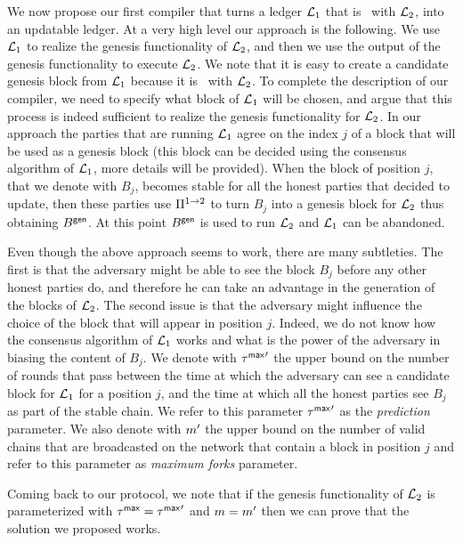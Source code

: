 We now propose our first compiler that turns a ledger $\mathcal{L}_1$ that is \gencompatible\ with $\mathcal{L}_2$,
into an updatable ledger.
At a very high level our approach is the following. We use $\mathcal{L}_1$ to realize the genesis functionality 
of $\mathcal{L}_2$, and then we use the output of the genesis functionality to execute $\mathcal{L}_2$.
We note that it is easy to create a candidate genesis block from $\mathcal{L}_1$ because it is \gencompatible\
with $\mathcal{L}_2$.
To complete the description of our compiler, we need to specify what block of $\mathcal{L}_1$ will be chosen, and
argue that this process is indeed sufficient to realize the genesis functionality for $\mathcal{L}_2$.
In our approach the parties that are running $\mathcal{L}_1$ agree on the index $j$ of a block that will be used
as a genesis block (this block can be decided using the consensus algorithm of $\mathcal{L}_1$, more details will be provided). 
When the block of position $j$, that we denote with $B_j$, becomes stable for all the honest parties that decided to update, then these parties use $\Pi^{1\rightarrow 2}$ to turn $B_j$ into a genesis block for $\mathcal{L}_2$ thus obtaining
$B^\mathsf{gen}$. At this point $B^\mathsf{gen}$ is used to run $\mathcal{L}_2$ and $\mathcal{L}_1$ can be abandoned.

Even though the above approach seems to work, there are many subtleties. The first is that the adversary might 
be able to see the block $B_j$ before any other honest parties do, and therefore he can take an advantage in the generation
of the blocks of $\mathcal{L}_2$. The second issue is that the adversary might influence the choice of the block
that will appear in position $j$. Indeed, we do not know how the consensus algorithm of $\mathcal{L}_1$ works and what is the power of the adversary in biasing the content of $B_j$. 
We denote with ${\tau^\mathsf{max}}'$ the upper bound on the number of rounds that pass between the time at which 
the adversary can see a candidate
block for $\mathcal{L}_1$ for a position $j$, and the time at which all the honest parties see $B_j$ as part of the stable chain. We refer to this parameter ${\tau^\mathsf{max}}'$ as the \emph{prediction} parameter. 
We also denote with ${m}'$ the upper bound on the number of valid chains that are broadcasted on the network that contain a block in position $j$ and refer to this parameter as \emph{maximum forks} parameter.

Coming back to our protocol, we note that if the genesis functionality of $\mathcal{L}_2$ is parameterized
with $\tau^\mathsf{max}={\tau^\mathsf{max}}'$ and $m={m}'$ then we can prove that the solution we proposed works.

